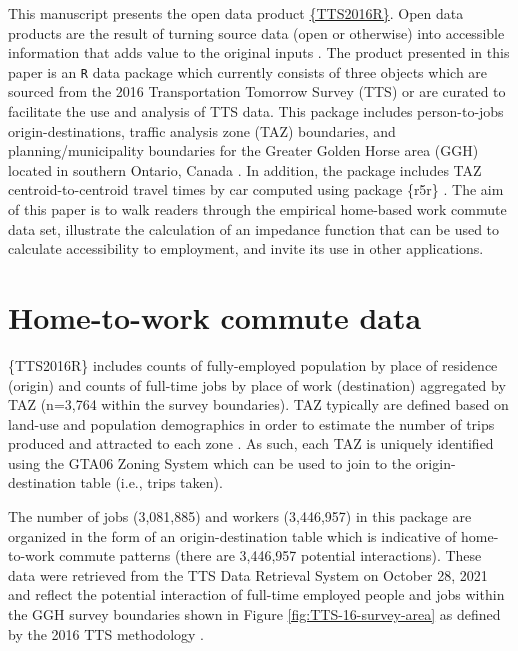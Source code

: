 \documentclass[Royal,times,sageh]{sagej}
\begin{document}
This manuscript presents the open data product
\href{https://github.com/soukhova/TTS2016R}{\{TTS2016R\}}. Open data
products are the result of turning source data (open or otherwise) into
accessible information that adds value to the original inputs
\citep[see][]{Arribas2021open}. The product presented in this paper is
an \texttt{R} data package which currently consists of three objects
which are sourced from the 2016 Transportation Tomorrow Survey (TTS) or
are curated to facilitate the use and analysis of TTS data. This package
includes person-to-jobs origin-destinations, traffic analysis zone (TAZ)
boundaries, and planning/municipality boundaries for the Greater Golden
Horse area (GGH) located in southern Ontario, Canada
\citep{data_management_group_tts_2018}. In addition, the package
includes TAZ centroid-to-centroid travel times by car computed using
package \{r5r\} \citep{Pereira2021r5r}. The aim of this paper is to walk
readers through the empirical home-based work commute data set,
illustrate the calculation of an impedance function that can be used to
calculate accessibility to employment, and invite its use in other
applications.

\hypertarget{home-to-work-commute-data}{%
\section{Home-to-work commute data}\label{home-to-work-commute-data}}

\{TTS2016R\} includes counts of fully-employed population by place of
residence (origin) and counts of full-time jobs by place of work
(destination) aggregated by TAZ (n=3,764 within the survey boundaries).
TAZ typically are defined based on land-use and population demographics
in order to estimate the number of trips produced and attracted to each
zone \citep{meyer_urban_2001}. As such, each TAZ is uniquely identified
using the GTA06 Zoning System which can be used to join to the
origin-destination table (i.e., trips taken).

The number of jobs (3,081,885) and workers (3,446,957) in this package
are organized in the form of an origin-destination table which is
indicative of home-to-work commute patterns (there are 3,446,957
potential interactions). These data were retrieved from the TTS Data
Retrieval System on October 28, 2021 and reflect the potential
interaction of full-time employed people and jobs within the GGH survey
boundaries shown in Figure \ref{fig:TTS-16-survey-area} as defined by
the 2016 TTS methodology \citep{data_management_group_tts_2018}.
\end{document}
